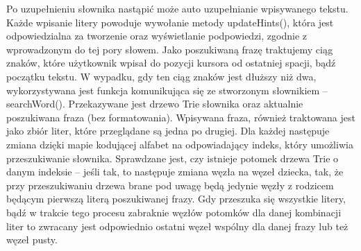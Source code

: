 \documentclass[twoside,a4paper]{book}
\begin{document}
Po uzupełnieniu słownika nastąpić może auto uzupełnianie wpisywanego tekstu.
Każde wpisanie litery powoduje wywołanie metody updateHints(), która jest odpowiedzialna za tworzenie oraz wyświetlanie podpowiedzi, zgodnie z wprowadzonym do tej pory słowem. Jako poszukiwaną frazę traktujemy ciąg znaków, które użytkownik wpisał do pozycji kursora od ostatniej spacji, bądź początku tekstu. W wypadku, gdy ten ciąg znaków jest dłuższy niż dwa, wykorzystywana jest funkcja komunikująca się ze stworzonym słownikiem – searchWord(). Przekazywane jest drzewo Trie słownika oraz aktualnie poszukiwana fraza (bez formatowania). 
Wpisywana fraza, również traktowana jest jako zbiór liter, które przeglądane są jedna po drugiej. Dla każdej następuje zmiana dzięki mapie kodującej alfabet na odpowiadający indeks, który umożliwia przeszukiwanie słownika. Sprawdzane jest, czy istnieje potomek drzewa Trie o danym indeksie – jeśli tak, to następuje zmiana węzła na węzeł dziecka, tak, że przy przeszukiwaniu drzewa brane pod uwagę będą jedynie węzły z rodzicem będącym pierwszą literą poszukiwanej frazy. Gdy przeszuka się wszystkie litery, bądź w trakcie tego procesu zabraknie węzłów potomków dla danej kombinacji liter to zwracany jest odpowiednio ostatni węzeł wspólny dla danej frazy lub też węzeł pusty. 
\end{document}
